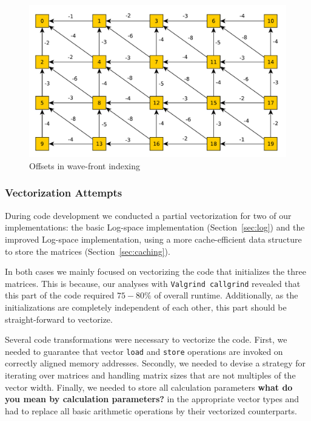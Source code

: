 \documentclass[runningheads,a4paper]{llncs}
\begin{document}
\begin{figure}
\centering
\includegraphics[scale=0.5]{images/unnamed0.pdf}
\caption{Offsets in wave-front indexing}
\label{fig:offset}
\end{figure}


\subsubsection{Vectorization Attempts}
\label{sec:vector}
During code development we conducted a partial vectorization for two of our implementations: 
the basic Log-space implementation (Section~\ref{sec:log}) and the improved Log-space implementation, using a more 
cache-efficient data structure to store the matrices (Section~\ref{sec:caching}).

In both cases we mainly focused on vectorizing the code that initializes the three matrices. 
This is because, our analyses with \texttt{Valgrind callgrind} revealed that this 
part of the code required $75-80\%$ of overall runtime. 
Additionally, as the initializations are completely independent of each other, this part should be straight-forward to vectorize.

Several code transformations were necessary to vectorize the code. 
First, we needed to guarantee that vector \texttt{load} and \texttt{store} operations are invoked on correctly aligned memory addresses. 
Secondly, we needed to devise a strategy for iterating over matrices and handling matrix sizes that are not multiples of the vector width.
Finally, we needed to store all calculation parameters {\bf what do you mean by calculation parameters?} in the appropriate vector types and 
had to replace all basic arithmetic operations by their vectorized counterparts.
\end{document}
